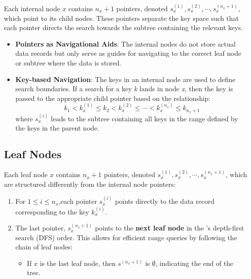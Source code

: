 Each internal node $x$ contains $n_x + 1$ pointers, denoted  $s^{(1)}_x,s^{(2)}_x,\cdots,s^{(n_x + 1)}_x$, which point to its child nodes. These pointers separate the key space such that each pointer directs the search towards the subtree containing the relevant keys.
        \begin{itemize}
            \item \textbf{Pointers as Navigational Aids}: The internal nodes do not store actual data records but only serve as guides for navigating to the correct leaf node or subtree where the data is stored.
        \end{itemize}
        \begin{itemize}
            \item \textbf{Key-based Navigation}: The keys in an internal node are used to define search boundaries. If a search for a key \textit{k} lands in node \textit{x}, then the key is passed to the appropriate child pointer based on the relationship: $$k_1<k_x^{(1)}\le k_2<k_x^{(2)}\le \cdots <k_x^{(n_x)}\le k_{n_x+1}$$
where $s^{(i)}_x$ leads to the subtree containing all keys in the range defined by the keys in the parent node.
        \end{itemize}

\subsection{Leaf Nodes}
    
Each leaf node $x$ contains $n_x + 1$ pointers, denoted $s^{(1)}_x,s^{(2)}_x,\cdots,s^{(n_x + 1)}_x$, which are structured differently from the internal node pointers:

        \begin{enumerate}
            \item For $1\le i\le n_x$,each pointer $s^{(i)}_x$ points directly to the data record corresponding to the key $k_x^{(i)}$.
            \item The last pointer, $s^{(n_x+1)}_x$ points to the \textbf{next leaf node} in the \bplustree's depth-first search (DFS) order. This allows for efficient range queries by following the chain of leaf nodes:\begin{itemize}
            \item If $x$ is the last leaf node, then $s^{(n_x+1)}$ is $\emptyset$, indicating the end of the tree.\end{itemize}
        \end{enumerate}
            

